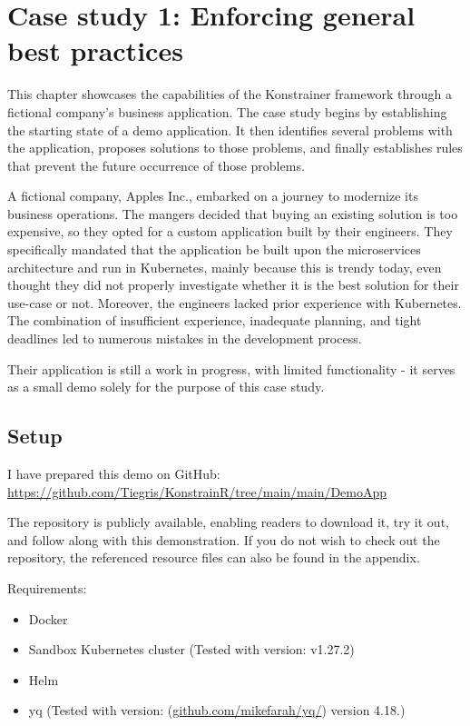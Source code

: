 \chapter{Case study 1: Enforcing general best practices}
\label{chap:case_study1}

This chapter showcases the capabilities of the Konstrainer framework through a fictional company's business application. The case study begins by establishing the starting state of a demo application. It then identifies several problems with the application, proposes solutions to those problems, and finally establishes rules that prevent the future occurrence of those problems.

A fictional company, Apples Inc., embarked on a journey to modernize its business operations. The mangers decided that buying an existing solution is too expensive, so they opted for a custom application built by their engineers. They specifically mandated that the application be built upon the microservices architecture and run in Kubernetes, mainly because this is trendy today, even thought they did not properly investigate whether it is the best solution for their use-case or not. Moreover, the engineers lacked prior experience with Kubernetes. The combination of insufficient experience, inadequate planning, and tight deadlines led to numerous mistakes in the development process.

Their application is still a work in progress, with limited functionality - it serves as a small demo solely for the purpose of this case study.

\section{Setup}

I have prepared this demo on GitHub: \url{https://github.com/Tiegris/KonstrainR/tree/main/main/DemoApp}

The repository is publicly available, enabling readers to download it, try it out, and follow along with this demonstration. If you do not wish to check out the repository, the referenced resource files can also be found in the appendix.

Requirements:

\begin{itemize}
    \item Docker
    \item Sandbox Kubernetes cluster (Tested with version: v1.27.2)
    \item Helm
    \item yq (Tested with version: (\url{github.com/mikefarah/yq/}) version 4.18.)
\end{itemize}

